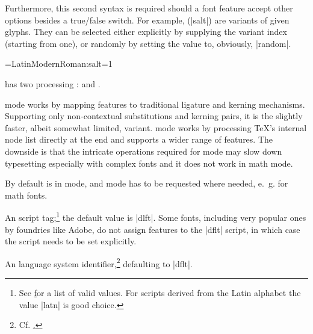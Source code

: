 \noindent
Furthermore, this second syntax is required should a font feature
accept other options besides a true/false switch.
%
For example,  (|salt|) are variants of
given glyphs.
%
They can be selected either explicitly by supplying the variant
index (starting from one), or randomly by setting the value to,
obviously, |random|.

\beginlisting
  \font\librmsaltfirst=LatinModernRoman:salt=1
\endlisting


\begindescriptions

          has two \OpenType processing
         :
          and .

          mode works by mapping \OpenType
         features to traditional \TEX ligature and kerning mechanisms.
         Supporting only non-contextual substitutions and kerning
         pairs, it is the slightly faster, albeit somewhat limited, variant.
          mode works by processing \TeX’s internal
         node list directly at the \LUA end and supports
         a wider range of \OpenType features.
         The downside is that the intricate operations required for
          mode may slow down typesetting especially
         with complex fonts and it does not work in math mode.

         By default  is in 
         mode, and  mode has to be requested where needed,
         e.~g. for math fonts.

   \label{script-tag}
         An \OpenType script tag;\footnote{%
           See \hyperlink {http://www.microsoft.com/typography/otspec/scripttags.htm}
           for a list of valid values.
           For scripts derived from the Latin alphabet the value
           |latn| is good choice.
         }
         the default value is |dlft|.
         Some fonts, including very popular ones by foundries like Adobe,
         do not assign features to the |dflt| script, in
         which case the script needs to be set explicitly.

         An \OpenType language system identifier,\footnote{%
           Cf. \hyperlink {http://www.microsoft.com/typography/otspec/languagetags.htm}.
         }
         defaulting to |dflt|.

